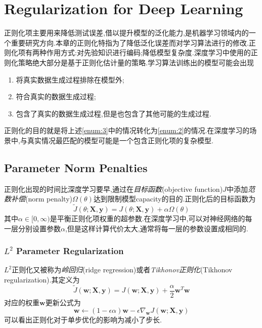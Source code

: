 \chapter{Regularization for Deep Learning}

正则化项主要用来降低测试误差,借以提升模型的泛化能力,是机器学习领域内的一个重要研究方向.本章的正则化特指为了降低泛化误差而对学习算法进行的修改.正则化项有两种作用方式:对先验知识进行编码;降低模型复杂度.深度学习中使用的正则化策略绝大部分是基于正则化估计量的策略.学习算法训练出的模型可能会出现
\begin{enumerate}
    \item 将真实数据生成过程排除在模型外;
    \item 符合真实的数据生成过程;\label{enum:2}
    \item 包含了真实的数据生成过程,但是也包含了其他可能的生成过程.\label{enum:3}
\end{enumerate}
正则化的目的就是将上述\ref{enum:3}中的情况转化为\ref{enum:2}的情况.在深度学习的场景中,与真实情况最匹配的模型可能是一个包含正则化项的复杂模型.

\section{Parameter Norm Penalties}

正则化出现的时间比深度学习要早,通过在\textit{目标函数}(objective function)$J$中添加\textit{范数补偿}(norm penalty)$\Omega(\theta)$达到限制模型capacity的目的.正则化后的目标函数为
\begin{equation}
\tilde J(\theta;\mathbf{X,y})=J(\theta;\mathbf{X,y})+\alpha\Omega(\theta)
\end{equation}
其中$\alpha\in[0,\infty)$是平衡正则化项权重的超参数.在深度学习中,可以对神经网络的每一层分别设置参数$\alpha$,但是这样计算代价太大,通常将每一层的参数设置成相同的.

\subsection{$L^2$ Parameter Regularization}

$L^2$正则化又被称为\textit{岭回归}(ridge regression)或者\textit{Tikhonov正则化}(Tikhonov regularization).其定义为
\begin{equation}
\tilde J(\mathbf w;\mathbf{X,y})=J(\mathbf w;\mathbf{X,y})+\frac{\alpha}{2}\mathbf w^T\mathbf w
\end{equation}
对应的权重$\mathbf w$更新公式为
\begin{equation}
\mathbf w\leftarrow(1-\epsilon\alpha)\mathbf w-\epsilon\nabla_{\mathbf w}J(\mathbf {w;X,y})
\end{equation}
可以看出正则化对于单步优化的影响为减小了步长.

